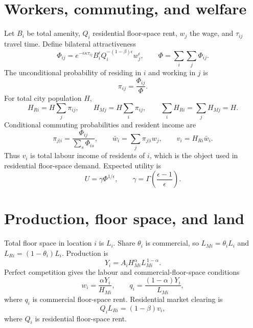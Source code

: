 \documentclass[11pt,a4paper]{article}
\begin{document}
\section{Workers, commuting, and welfare}
Let $B_i$ be total amenity, $Q_i$ residential floor-space rent, $w_j$ the wage,
and $\tau_{ij}$ travel time. Define bilateral attractiveness
\begin{equation}
 \Phi_{ij}=
 e^{-\epsilon\kappa\tau_{ij}}
 B_i^\epsilon Q_i^{-(1-\beta)\epsilon}w_j^\epsilon,
 \qquad
 \Phi=\sum_i\sum_j\Phi_{ij}.                         \label{eq:phi}
\end{equation}
The unconditional probability of residing in $i$ and working in $j$ is
\begin{equation}
 \pi_{ij}=\frac{\Phi_{ij}}{\Phi}.                     \label{eq:pi}
\end{equation}
For total city population $H$,
\begin{equation}
 H_{Ri}=H\sum_j\pi_{ij},\qquad
 H_{Mj}=H\sum_i\pi_{ij},\qquad
 \sum_iH_{Ri}=\sum_jH_{Mj}=H.                        \label{eq:margins}
\end{equation}
Conditional commuting probabilities and resident income are
\begin{equation}
 \pi_{j|i}=\frac{\Phi_{ij}}{\sum_s\Phi_{is}},\qquad
 \bar w_i=\sum_j\pi_{j|i}w_j,\qquad
 v_i=H_{Ri}\bar w_i.                                  \label{eq:income}
\end{equation}
Thus $v_i$ is total labour income of residents of $i$, which is the object used
in residential floor-space demand. Expected utility is
\begin{equation}
 U=\gamma\Phi^{1/\epsilon},\qquad
 \gamma=\Gamma\!\left(\frac{\epsilon-1}{\epsilon}\right). \label{eq:utility}
\end{equation}

\section{Production, floor space, and land}
Total floor space in location $i$ is $L_i$. Share $\theta_i$ is commercial, so
$L_{Mi}=\theta_iL_i$ and $L_{Ri}=(1-\theta_i)L_i$. Production is
\begin{equation}
 Y_i=A_iH_{Mi}^{\alpha}L_{Mi}^{\,1-\alpha}.           \label{eq:production}
\end{equation}
Perfect competition gives the labour and commercial-floor-space conditions
\begin{equation}
 w_i=\frac{\alpha Y_i}{H_{Mi}},\qquad
 q_i=\frac{(1-\alpha)Y_i}{L_{Mi}},                    \label{eq:firmfoc}
\end{equation}
where $q_i$ is commercial floor-space rent. Residential market clearing is
\begin{equation}
 Q_iL_{Ri}=(1-\beta)v_i,                              \label{eq:resclear}
\end{equation}
where $Q_i$ is residential floor-space rent.
\end{document}
